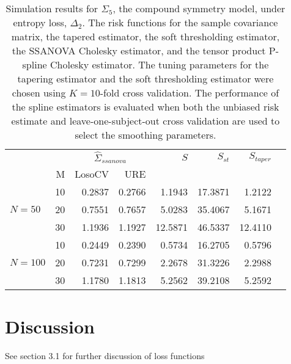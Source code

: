 \documentclass[12pt]{article}
\theoremstyle{definition}
\begin{document}
\begin{table}[ht]
\centering
\caption{Simulation results for $\Sigma_5$, the compound symmetry model, under entropy loss, $\Delta_2$. The risk functions for the sample covariance matrix, the tapered estimator, the soft thresholding estimator, the SSANOVA Cholesky estimator, and the tensor product P-spline Cholesky estimator. The tuning parameters for the tapering estimator and the soft thresholding estimator were chosen using $K = 10$-fold cross validation. The performance of the spline estimators is evaluated when both the unbiased risk estimate and leave-one-subject-out cross validation are used to select the smoothing parameters.}
\begin{tabular}{l|r|rrrrrr}
&  & \multicolumn{2}{c}{$\hat{\Sigma}_{ssanova}$} & $S$ & $S_{st}$ & $S_{taper}$ \\ 
&M & \mbox{LosoCV} & \mbox{URE} &  \\ 
  \hline
 &    10 & 0.2837 & 	  0.2766	& 1.1943 &  17.3871 & 1.2122 \\ 
$N = 50$&    20 & 0.7551& 0.7657& 5.0283& 35.4067 & 5.1671 \\ 
  &    30 & 1.1936 & 1.1927& 12.5871& 46.5337 & 12.4110  \\ \hdashline
 &    10 & 0.2449 &  0.2390 & 0.5734 & 16.2705 & 0.5796\\ 
  $N = 100$ &    20 & 0.7231 & 0.7299 & 2.2678& 31.3226 & 2.2988 \\ 
   &    30 & 1.1780 & 1.1813 & 5.2562 & 39.2108 & 5.2592 \\
  \end{tabular}
\end{table}



\section{Discussion}

See \citet{pourahmadi2011covariance} section 3.1 for further discussion of loss functions
\end{document}
